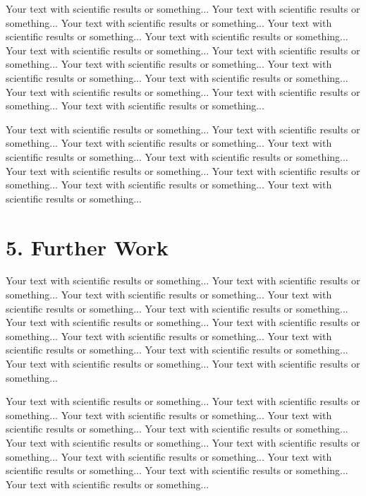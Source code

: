 \documentclass[final]{beamer}
\begin{document}
\begin{frame}[t]
\begin{multicols}{3}
Your text with scientific results or something... 
Your text with scientific results or something... 
Your text with scientific results or something... 
Your text with scientific results or something... 
Your text with scientific results or something... 
Your text with scientific results or something... 
Your text with scientific results or something... 
Your text with scientific results or something... 
Your text with scientific results or something... 
Your text with scientific results or something... 
Your text with scientific results or something... 
Your text with scientific results or something... 
Your text with scientific results or something... 

Your text with scientific results or something... 
Your text with scientific results or something... 
Your text with scientific results or something... 
Your text with scientific results or something... 
Your text with scientific results or something... 
Your text with scientific results or something... 
Your text with scientific results or something... 
Your text with scientific results or something...
Your text with scientific results or something...

\section{5. Further Work}

Your text with scientific results or something... 
Your text with scientific results or something... 
Your text with scientific results or something... 
Your text with scientific results or something... 
Your text with scientific results or something... 
Your text with scientific results or something... 
Your text with scientific results or something... 
Your text with scientific results or something... 
Your text with scientific results or something... 
Your text with scientific results or something... 
Your text with scientific results or something... 
Your text with scientific results or something... 

Your text with scientific results or something... 
Your text with scientific results or something... 
Your text with scientific results or something... 
Your text with scientific results or something... 
Your text with scientific results or something... 
Your text with scientific results or something... 
Your text with scientific results or something... 
Your text with scientific results or something... 
Your text with scientific results or something... 
Your text with scientific results or something... 
Your text with scientific results or something... 



\end{multicols}
\end{frame}
\end{document}
